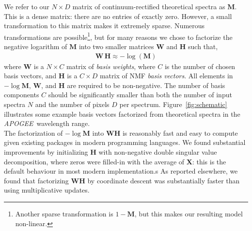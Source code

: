 \documentclass[modern]{aastex631}
\newcommand{\project}[1]{\textit{#1}}
\renewcommand{\vec}[1]{\mathbf{#1}}
\newcommand{\vectheta}{\boldsymbol{\theta}}
\newcommand{\vecpsi}{\boldsymbol{\psi}}
\newcommand{\vecW}{\mathbf{W}}
\newcommand{\vecH}{\mathbf{H}}
\newcommand{\vecX}{\mathbf{X}}
\newcommand{\apogee}{\project{APOGEE}}
\begin{document}
We refer to our $N \times D$ matrix of continuum-rectified theoretical spectra as $\vec{M}$. This is a dense matrix: there are no entries of exactly zero. However, a small transformation to this matrix makes it extremely sparse. Numerous transformations are possible\footnote{Another sparse transformation is $1 - \vec{M}$, but this makes our resulting model non-linear.}, but for many reasons we chose to factorize the negative logarithm of $\vec{M}$ into two smaller matrices $\vec{W}$ and $\vec{H}$ such that,
\begin{align}
    \label{eq:nmf}
    \vec{W}\,\vec{H} \approx -\log\left({\vec{M}}\right)
\end{align}
where $\vec{W}$ is a $N \times C$ matrix of \emph{basis weights}, where $C$ is the number of chosen basis vectors, and $\vec{H}$ is a $C \times D$ matrix of NMF \emph{basis vectors}. All elements in $-\log{\vec{M}}$, $\vec{W}$, and $\vec{H}$ are required to be non-negative. The number of basis components $C$ should be significantly smaller than both the number of input spectra $N$ and the number of pixels $D$ per spectrum. Figure~\ref{fig:schematic} illustrates some example basis vectors factorized from theoretical spectra in the \apogee\ wavelength range.\\






The factorization of $-\log{\vec{M}}$ into $\vecW\vecH$ is reasonably fast and easy to compute given existing packages in modern programming languages. We found substantial improvements by initializing $\vecH$ with non-negative double singular value decomposition, where zeros were filled-in with the average of $\vecX$: this is the default behaviour in most modern implementation.s As reported elsewhere, we found that factorizing $\vecW\vecH$ by coordinate descent was substantially faster than using multiplicative updates.\\
\end{document}
